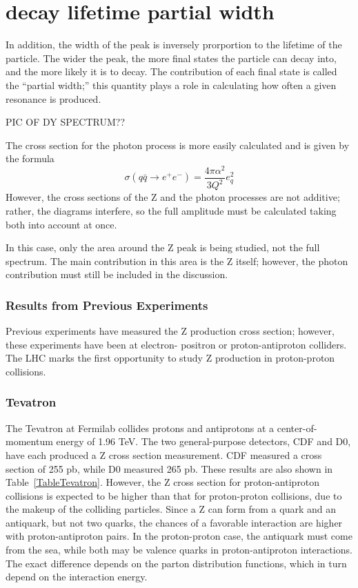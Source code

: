 \section{decay lifetime partial width}
In addition, the width of the peak is inversely prorportion to the   %
lifetime of the particle.  
The wider the peak, the more final states the particle can decay into, 
and the more likely it is to decay.  
The contribution of each final state is called the 
``partial width;'' 
this quantity plays a role in calculating 
how often a given resonance is produced.  

PIC OF DY SPECTRUM??


The cross section for the photon process 
is more easily calculated and is given by the formula
\[
\sigma(q \bar{q} \rightarrow e^+ e^-) 
= \frac{4 \pi \alpha^2}{3 Q^2} e_q^2
\]
However, the cross sections of the Z and the photon 
processes are not additive; 
rather, the diagrams interfere, 
so the full amplitude must be calculated taking 
both into account at once.  

In this case, only the area around the Z peak is being 
studied, not the full spectrum.  
The main contribution in this area is the Z itself; 
however, the photon contribution must still be included 
in the discussion.  


\subsubsection{Results from Previous Experiments}
\label{theory:prev}

Previous experiments have measured the Z production cross section; however, these experiments have been at electron-
positron or proton-antiproton colliders.  The LHC marks the first opportunity to study Z production in proton-proton 
collisions.  

\subsubsection{Tevatron}

The Tevatron at Fermilab collides protons and antiprotons 
at a center-of-momentum energy of 1.96 TeV.  
The two general-purpose detectors, CDF and D0, 
have each produced a Z cross section measurement.  
CDF measured a cross section of 255 pb, while D0 measured 265 pb.  
These results are also shown in 
Table~\ref{TableTevatron}.  
However, the Z cross section for proton-antiproton collisions 
is expected to be higher than that for proton-proton collisions, 
due to the makeup of the 
colliding particles.  
Since a Z can form from a quark and an antiquark, 
but not two quarks, the chances of a favorable 
interaction are higher with proton-antiproton pairs.  
In the proton-proton case, the antiquark must come from the sea, 
while both may be valence quarks in proton-antiproton interactions.  
The exact difference depends on the parton 
distribution functions, 
which in turn depend on the interaction energy.  

